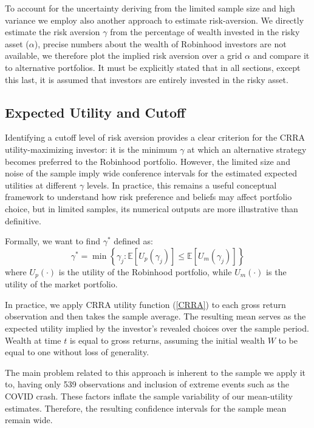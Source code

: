 To account for the uncertainty deriving from the limited sample size and high variance we employ also another approach to estimate risk-aversion. 
We directly estimate the risk aversion $\gamma$ from the percentage of wealth invested in the risky asset ($\alpha$), 
precise numbers about the wealth of Robinhood investors are not available, we therefore plot the implied risk aversion over a grid $\alpha$ and compare it to alternative portfolios.
It must be explicitly stated that in all sections, except this last, it is assumed that investors are entirely invested in the risky asset.

\subsection{Expected Utility and Cutoff}
\label{sec:cutoff}
Identifying a cutoff level of risk aversion provides a clear criterion for the CRRA utility-maximizing investor: 
it is the minimum $\gamma$ at which an alternative strategy becomes preferred to the Robinhood portfolio.
However, the limited size and noise of the sample imply wide conference intervals for the estimated expected utilities at different $\gamma$ levels.
In practice, this remains a useful conceptual framework to understand how risk preference and beliefs may affect portfolio choice, but in limited samples, its numerical outputs are more illustrative than definitive.

Formally, we want to find $\gamma^*$ defined as:
\begin{equation}
    \gamma^* = \min\left\{ \gamma_j : \mathbb{E}[U_p(\gamma_j)] \leq \mathbb{E}[U_m(\gamma_j)] \right\}
    \label{gamma_cutoff}
\end{equation}
where $U_p(\cdot)$ is the utility of the Robinhood portfolio, while $U_m(\cdot)$ is the utility of the market portfolio.

In practice, we apply CRRA utility function (\ref{CRRA}) to each gross return observation and then takes the sample average.
The resulting mean serves as the expected utility implied by the investor's revealed choices over the sample period.
Wealth at time $t$ is equal to gross returns, assuming the initial wealth $W$ to be equal to one without loss of generality.


The main problem related to this approach is inherent to the sample we apply it to, having only 539 observations and inclusion of extreme events such as the COVID crash. 
These factors inflate the sample variability of our mean-utility estimates. 
Therefore, the resulting confidence intervals for the sample mean remain wide. 

